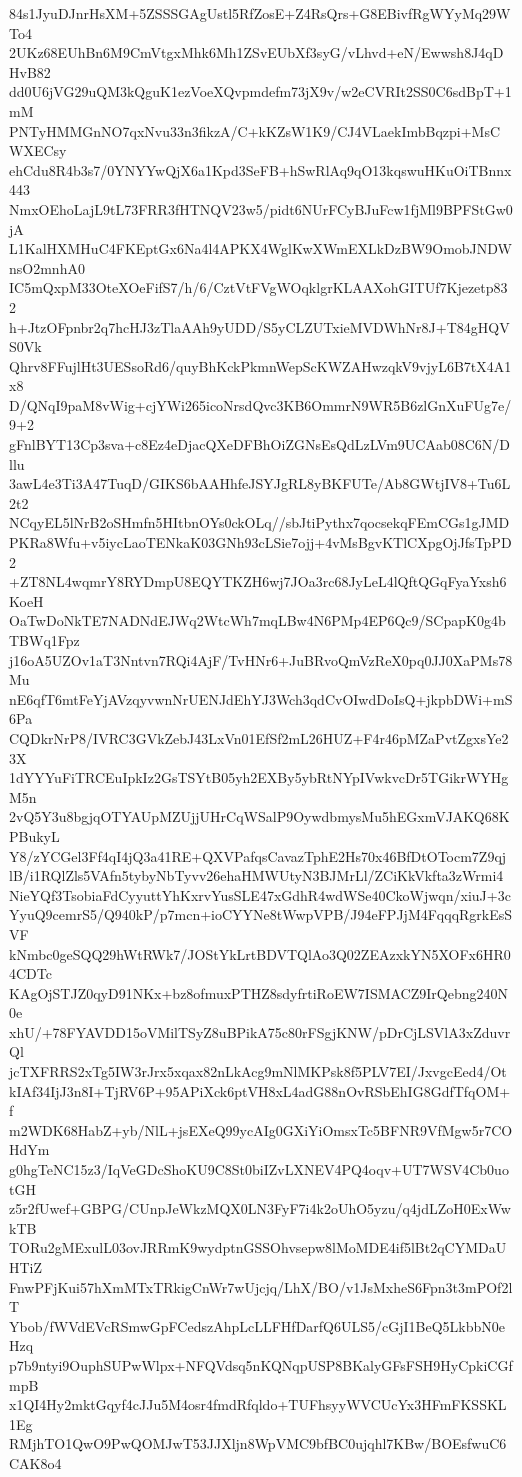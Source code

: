 84s1JyuDJnrHsXM+5ZSSSGAgUstl5RfZosE+Z4RsQrs+G8EBivfRgWYyMq29WTo4
2UKz68EUhBn6M9CmVtgxMhk6Mh1ZSvEUbXf3syG/vLhvd+eN/Ewwsh8J4qDHvB82
dd0U6jVG29uQM3kQguK1ezVoeXQvpmdefm73jX9v/w2eCVRIt2SS0C6sdBpT+1mM
PNTyHMMGnNO7qxNvu33n3fikzA/C+kKZsW1K9/CJ4VLaekImbBqzpi+MsCWXECsy
ehCdu8R4b3s7/0YNYYwQjX6a1Kpd3SeFB+hSwRlAq9qO13kqswuHKuOiTBnnx443
NmxOEhoLajL9tL73FRR3fHTNQV23w5/pidt6NUrFCyBJuFcw1fjMl9BPFStGw0jA
L1KalHXMHuC4FKEptGx6Na4l4APKX4WglKwXWmEXLkDzBW9OmobJNDWnsO2mnhA0
IC5mQxpM33OteXOeFifS7/h/6/CztVtFVgWOqklgrKLAAXohGITUf7Kjezetp832
h+JtzOFpnbr2q7hcHJ3zTlaAAh9yUDD/S5yCLZUTxieMVDWhNr8J+T84gHQVS0Vk
Qhrv8FFujlHt3UESsoRd6/quyBhKckPkmnWepScKWZAHwzqkV9vjyL6B7tX4A1x8
D/QNqI9paM8vWig+cjYWi265icoNrsdQvc3KB6OmmrN9WR5B6zlGnXuFUg7e/9+2
gFnlBYT13Cp3sva+c8Ez4eDjacQXeDFBhOiZGNsEsQdLzLVm9UCAab08C6N/Dllu
3awL4e3Ti3A47TuqD/GIKS6bAAHhfeJSYJgRL8yBKFUTe/Ab8GWtjIV8+Tu6L2t2
NCqyEL5lNrB2oSHmfn5HItbnOYs0ckOLq//sbJtiPythx7qocsekqFEmCGs1gJMD
PKRa8Wfu+v5iycLaoTENkaK03GNh93cLSie7ojj+4vMsBgvKTlCXpgOjJfsTpPD2
+ZT8NL4wqmrY8RYDmpU8EQYTKZH6wj7JOa3rc68JyLeL4lQftQGqFyaYxsh6KoeH
OaTwDoNkTE7NADNdEJWq2WtcWh7mqLBw4N6PMp4EP6Qc9/SCpapK0g4bTBWq1Fpz
j16oA5UZOv1aT3Nntvn7RQi4AjF/TvHNr6+JuBRvoQmVzReX0pq0JJ0XaPMs78Mu
nE6qfT6mtFeYjAVzqyvwnNrUENJdEhYJ3Wch3qdCvOIwdDoIsQ+jkpbDWi+mS6Pa
CQDkrNrP8/IVRC3GVkZebJ43LxVn01EfSf2mL26HUZ+F4r46pMZaPvtZgxsYe23X
1dYYYuFiTRCEuIpkIz2GsTSYtB05yh2EXBy5ybRtNYpIVwkvcDr5TGikrWYHgM5n
2vQ5Y3u8bgjqOTYAUpMZUjjUHrCqWSalP9OywdbmysMu5hEGxmVJAKQ68KPBukyL
Y8/zYCGel3Ff4qI4jQ3a41RE+QXVPafqsCavazTphE2Hs70x46BfDtOTocm7Z9qj
lB/i1RQlZls5VAfn5tybyNbTyvv26ehaHMWUtyN3BJMrLl/ZCiKkVkfta3zWrmi4
NieYQf3TsobiaFdCyyuttYhKxrvYusSLE47xGdhR4wdWSe40CkoWjwqn/xiuJ+3c
YyuQ9cemrS5/Q940kP/p7mcn+ioCYYNe8tWwpVPB/J94eFPJjM4FqqqRgrkEsSVF
kNmbc0geSQQ29hWtRWk7/JOStYkLrtBDVTQlAo3Q02ZEAzxkYN5XOFx6HR04CDTc
KAgOjSTJZ0qyD91NKx+bz8ofmuxPTHZ8sdyfrtiRoEW7ISMACZ9IrQebng240N0e
xhU/+78FYAVDD15oVMilTSyZ8uBPikA75c80rFSgjKNW/pDrCjLSVlA3xZduvrQl
jcTXFRRS2xTg5IW3rJrx5xqax82nLkAcg9mNlMKPsk8f5PLV7EI/JxvgcEed4/Ot
kIAf34IjJ3n8I+TjRV6P+95APiXck6ptVH8xL4adG88nOvRSbEhIG8GdfTfqOM+f
m2WDK68HabZ+yb/NlL+jsEXeQ99ycAIg0GXiYiOmsxTc5BFNR9VfMgw5r7COHdYm
g0hgTeNC15z3/IqVeGDcShoKU9C8St0biIZvLXNEV4PQ4oqv+UT7WSV4Cb0uotGH
z5r2fUwef+GBPG/CUnpJeWkzMQX0LN3FyF7i4k2oUhO5yzu/q4jdLZoH0ExWwkTB
TORu2gMExulL03ovJRRmK9wydptnGSSOhvsepw8lMoMDE4if5lBt2qCYMDaUHTiZ
FnwPFjKui57hXmMTxTRkigCnWr7wUjcjq/LhX/BO/v1JsMxheS6Fpn3t3mPOf2lT
Ybob/fWVdEVcRSmwGpFCedszAhpLcLLFHfDarfQ6ULS5/cGjI1BeQ5LkbbN0eHzq
p7b9ntyi9OuphSUPwWlpx+NFQVdsq5nKQNqpUSP8BKalyGFsFSH9HyCpkiCGfmpB
x1QI4Hy2mktGqyf4cJJu5M4osr4fmdRfqldo+TUFhsyyWVCUcYx3HFmFKSSKL1Eg
RMjhTO1QwO9PwQOMJwT53JJXljn8WpVMC9bfBC0ujqhl7KBw/BOEsfwuC6CAK8o4

